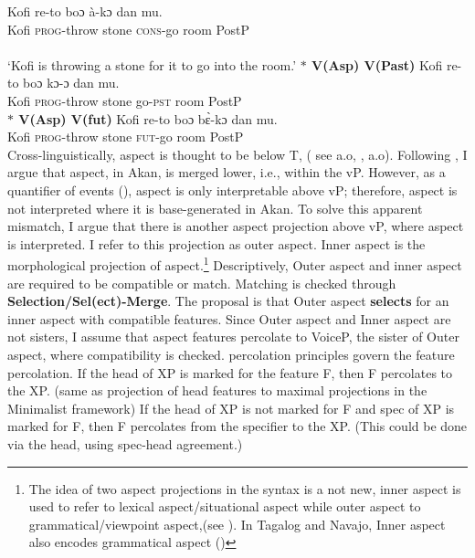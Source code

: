 \documentclass[output=paper,colorlinks,citecolor=brown]{langscibook}
\begin{document}
\ea\label{ex041} 
\gll Kofi re-to boɔ \`a-kɔ dan mu.\\
	Kofi \textsc{prog}-throw stone \textsc{cons}-go room PostP\\
	 \\
\glt `Kofi is throwing a stone for it to go into the room.'
\z 
\ex\label{ex051}
\textbf{$\ast$ \phantom {} {} {}  V(Asp)\phantom {} {} {}   V(Past)} 
     \ea\label{ex7} 
\gll * Kofi re-to boɔ kɔ-ɔ dan mu.\\
	{} Kofi \textsc{prog}-throw  stone  go-\textsc{pst} room PostP\\
\z 
\ex\label{ex061}
\textbf{$\ast$ \phantom {} {} {}  V(Asp)\phantom {} {} {}   V(fut)} 
     \ea\label{ex1} 
\gll * Kofi re-to boɔ  b\`{ɛ}-kɔ dan mu.\\
	{} Kofi \textsc{prog}-throw stone  \textsc{fut}-go room PostP\\

\z 
\z \z Cross-linguistically, aspect is thought to be below T, ( see \citet{Rizzi2004} \citet{Rizzi2013Notes} a.o, \citet{Cinque2002, Cinque2006}, \citet{RizziCinque2016} \citet{CinqueRizzi2010} a.o). Following \citet{Kandybowicz2010, Kandybowicz2015}, I argue that aspect, in Akan, is merged lower, i.e., within the vP.  However, as a quantifier of events (\citet{Hacquard2006}), aspect is only interpretable above vP; therefore, aspect is not interpreted where it is base-generated in Akan. To solve this apparent mismatch, I argue that there is another aspect projection above vP, where aspect is interpreted. I refer to this projection as outer aspect. Inner aspect is the morphological projection of aspect.\footnote{The idea of two aspect projections in the syntax is a not new, inner aspect is used to refer to lexical aspect/situational aspect while outer aspect to grammatical/viewpoint aspect,(see \citealt{Travis2010, Travis1991, Smith1991, MacDonald2006}). In Tagalog and Navajo, Inner aspect also encodes grammatical aspect (\citet{Travis2010})} Descriptively, Outer aspect and inner aspect are required to be compatible or match. Matching is checked through \textbf{Selection/Sel(ect)-Merge}. The proposal is that Outer aspect \textbf{selects} for an inner aspect with compatible features. Since Outer aspect and Inner aspect are not sisters, 
I assume that aspect features percolate to VoiceP, the sister of Outer aspect, where compatibility is checked.  percolation principles govern the feature percolation. \nocite{Webelhuth1992}
\ea \label{ex16}
\ea If the head of XP is marked for the feature F, then F percolates to the XP. (same as projection of head features to maximal projections in the Minimalist framework)
\ex If the head of XP is not marked for F and spec of XP is marked for F, then F percolates from the specifier to the XP. (This could be done via the head, using spec-head agreement.)
\end{document}
